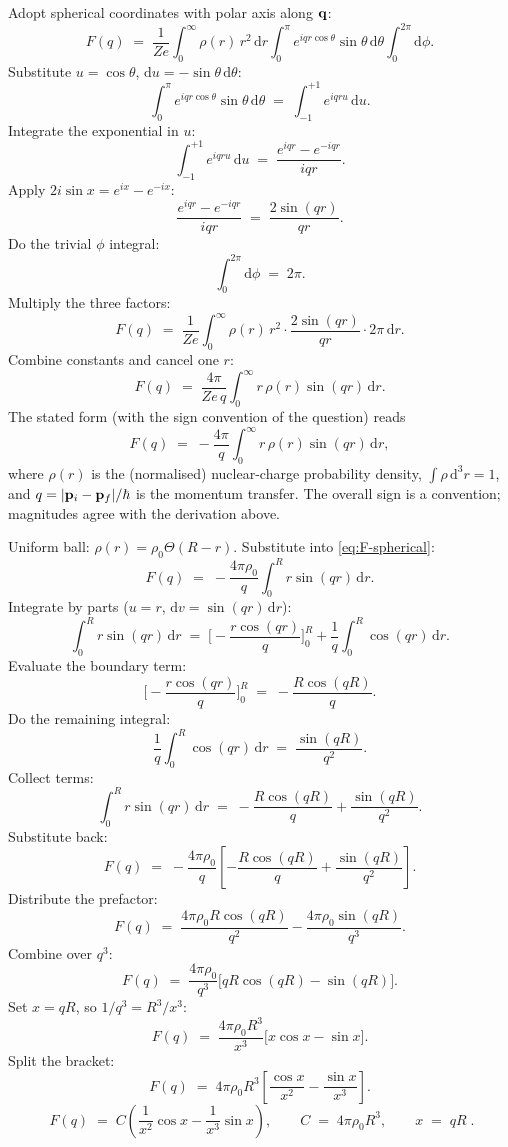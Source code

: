 \documentclass[11pt]{article}
\newcommand{\de}{\mathrm{d}}
\begin{document}
Adopt spherical coordinates with polar axis along $\vb q$:
\[
F(q)\;=\;\frac{1}{Ze}\int_{0}^{\infty}\rho(r)\,r^{2}\,\de r\int_{0}^{\pi}e^{iqr\cos\theta}\sin\theta\,\de\theta\int_{0}^{2\pi}\de\phi.
\]
Substitute $u=\cos\theta$, $\de u=-\sin\theta\,\de\theta$:
\[
\int_{0}^{\pi}e^{iqr\cos\theta}\sin\theta\,\de\theta\;=\;\int_{-1}^{+1}e^{iqru}\,\de u.
\]
Integrate the exponential in $u$:
\[
\int_{-1}^{+1}e^{iqru}\,\de u\;=\;\frac{e^{iqr}-e^{-iqr}}{iqr}.
\]
Apply $2i\sin x=e^{ix}-e^{-ix}$:
\[
\frac{e^{iqr}-e^{-iqr}}{iqr}\;=\;\frac{2\sin(qr)}{qr}.
\]
Do the trivial $\phi$ integral:
\[
\int_{0}^{2\pi}\de\phi\;=\;2\pi.
\]
Multiply the three factors:
\[
F(q)\;=\;\frac{1}{Ze}\int_{0}^{\infty}\rho(r)\,r^{2}\cdot\frac{2\sin(qr)}{qr}\cdot 2\pi\,\de r.
\]
Combine constants and cancel one $r$:
\[
F(q)\;=\;\frac{4\pi}{Ze\,q}\int_{0}^{\infty}r\,\rho(r)\sin(qr)\,\de r.
\]
The stated form (with the sign convention of the question) reads
\begin{equation}
F(q)\;=\;-\frac{4\pi}{q}\int_{0}^{\infty}r\,\rho(r)\sin(qr)\,\de r,
\label{eq:F-spherical}
\end{equation}
where $\rho(r)$ is the (normalised) nuclear-charge probability density, $\int\rho\,\de^{3}r=1$, and $q=|\vb p_i-\vb p_f|/\hbar$ is the momentum transfer. The overall sign is a convention; magnitudes agree with the derivation above.

Uniform ball: $\rho(r)=\rho_{0}\Theta(R-r)$. Substitute into \eqref{eq:F-spherical}:
\[
F(q)\;=\;-\frac{4\pi\rho_{0}}{q}\int_{0}^{R}r\sin(qr)\,\de r.
\]
Integrate by parts ($u=r$, $\de v=\sin(qr)\,\de r$):
\[
\int_{0}^{R}r\sin(qr)\,\de r\;=\;\Big[-\frac{r\cos(qr)}{q}\Big]_{0}^{R}+\frac{1}{q}\int_{0}^{R}\cos(qr)\,\de r.
\]
Evaluate the boundary term:
\[
\Big[-\frac{r\cos(qr)}{q}\Big]_{0}^{R}\;=\;-\frac{R\cos(qR)}{q}.
\]
Do the remaining integral:
\[
\frac{1}{q}\int_{0}^{R}\cos(qr)\,\de r\;=\;\frac{\sin(qR)}{q^{2}}.
\]
Collect terms:
\[
\int_{0}^{R}r\sin(qr)\,\de r\;=\;-\frac{R\cos(qR)}{q}+\frac{\sin(qR)}{q^{2}}.
\]
Substitute back:
\[
F(q)\;=\;-\frac{4\pi\rho_{0}}{q}\left[-\frac{R\cos(qR)}{q}+\frac{\sin(qR)}{q^{2}}\right].
\]
Distribute the prefactor:
\[
F(q)\;=\;\frac{4\pi\rho_{0}R\cos(qR)}{q^{2}}-\frac{4\pi\rho_{0}\sin(qR)}{q^{3}}.
\]
Combine over $q^{3}$:
\[
F(q)\;=\;\frac{4\pi\rho_{0}}{q^{3}}\bigl[qR\cos(qR)-\sin(qR)\bigr].
\]
Set $x=qR$, so $1/q^{3}=R^{3}/x^{3}$:
\[
F(q)\;=\;\frac{4\pi\rho_{0}R^{3}}{x^{3}}\bigl[x\cos x-\sin x\bigr].
\]
Split the bracket:
\[
F(q)\;=\;4\pi\rho_{0}R^{3}\left[\frac{\cos x}{x^{2}}-\frac{\sin x}{x^{3}}\right].
\]
\begin{equation}
\boxed{\;F(q)\;=\;C\!\left(\frac{1}{x^{2}}\cos x-\frac{1}{x^{3}}\sin x\right),\qquad C\;=\;4\pi\rho_{0}R^{3},\qquad x\;=\;qR\;.}
\label{eq:F-uniform}
\end{equation}
\end{document}
